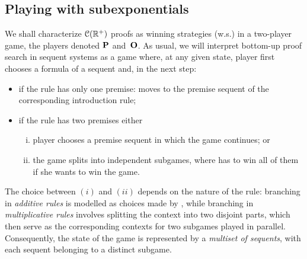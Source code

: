 \subsection{Playing with subexponentials}
We shall  characterize $\mathcal{C}(\mathbb{R}^+)$ proofs as winning strategies (w.s.) in a two-player game, the players denoted $\mathbf{P}$ and~$\mathbf{O}$. As usual, 
we will interpret bottom-up proof search in sequent systems as a game where,  at any given state, player \I first 
chooses a formula of a sequent and, in the next step: 
\begin{itemize}
\item if the rule has
only one premise: \I moves to the premise sequent of the corresponding introduction rule; 
\item if the rule has two premises either
\begin{enumerate}[(i)]
\item player \II
chooses 
a premise sequent in which the game continues; or
\item  the game splits into independent subgames, where \I has to win all of them if she wants to win the game.
\end{enumerate}
\end{itemize}
The choice between $(i)$ and $(ii)$ depends on the nature of the rule:
branching in {\em additive rules} is modelled as choices made by \II, while branching in {\em multiplicative rules} involves \I splitting the context into two disjoint parts, which then serve as the corresponding contexts for two subgames played in parallel. Consequently, the state of the game is represented by a \textit{multiset of sequents}, with each sequent belonging to a distinct subgame.

